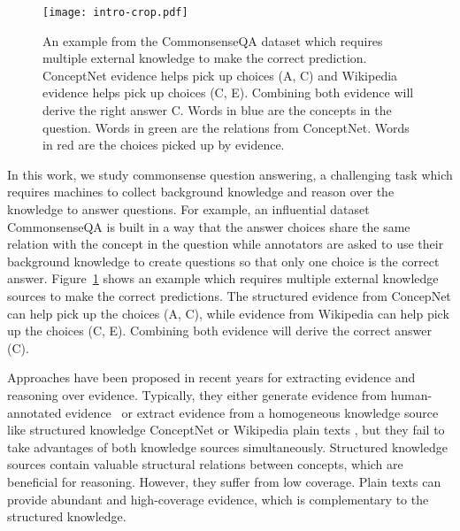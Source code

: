 \documentclass[letterpaper]{article} \usepackage{aaai20}  \usepackage{times}  \usepackage{helvet} \usepackage{courier}  \usepackage[hyphens]{url}  \usepackage{graphicx} \urlstyle{rm} \def\UrlFont{\rm}  \usepackage{graphicx}  \frenchspacing  \setlength{\pdfpagewidth}{8.5in}  \setlength{\pdfpageheight}{11in}
\begin{document}
\begin{figure}[t]
	\centering
	\texttt{[image: intro-crop.pdf]}
	\caption{An example from the CommonsenseQA dataset which requires multiple external knowledge to make the correct prediction. ConceptNet evidence helps pick up choices (A, C) and Wikipedia evidence helps pick up choices (C, E). Combining both evidence will derive the right answer C. Words in blue are the concepts in the question. Words in green are the relations from ConceptNet. Words in red are the choices picked up by evidence.}
	\label{fig:intro_example}
\end{figure}

In this work, we study commonsense question answering, a challenging task which requires machines to collect background knowledge and reason over the knowledge to answer questions. For example, an influential dataset CommonsenseQA \cite{talmor2019commonsenseqa} is built in a way that the answer choices share the same relation with the concept in the question while annotators are asked to use their background knowledge to create questions so that only one choice is the correct answer. Figure~\ref{fig:intro_example} shows an example which requires multiple external knowledge sources to make the correct predictions. 
The structured evidence from ConcepNet can help pick up the choices (A, C), while evidence from Wikipedia can help pick up the choices (C, E).
Combining both evidence will derive the correct answer (C).

Approaches have been proposed in recent years for extracting evidence and reasoning over evidence. Typically, they either generate evidence from human-annotated evidence~\cite{RajaniMXS19} or extract evidence from a homogeneous knowledge source like structured knowledge ConceptNet \cite{kag2019,bauer2018commonsense,mihaylov2018knowledgeable} or Wikipedia plain texts \cite{ryu2014open,yang2015wikiqa,chen2017reading}, but they fail to take  advantages of both knowledge sources simultaneously. Structured knowledge sources contain valuable structural relations between concepts, which are beneficial for reasoning. However, they suffer from low coverage. Plain texts can provide abundant and high-coverage evidence, which is complementary to the structured knowledge.
\end{document}
